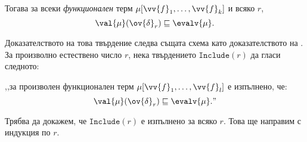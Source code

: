 \begin{proposition}
  \label{pr:rec:op-value-inclusion2}
  Тогава за всеки {\em функционален} терм $\mu[\vv{f}_1,\dots,\vv{f}_k]$ и всяко $r$,
  \[\val{\mu}(\ov{\delta}_r) \sqsubseteq \evalv{\mu}.\]
\end{proposition}
\begin{hint}
  
  Доказателството на това твърдение следва същата схема като доказателството на .
  За произволно естествено число $r$, нека твърдението $\texttt{Include}(r)$ да гласи следното:

  ,,за произволен функционален терм $\mu[\vv{f}_1,\dots,\vv{f}_l]$
  е изпълнено, че:
  \[\val{\mu}(\ov{\delta}_r) \sqsubseteq \evalv{\mu}.\text{''}\]
  
  Трябва да докажем, че $\texttt{Include}(r)$ е изпълнено за всяко $r$.
  Това ще направим с индукция по $r$.



\end{hint}
